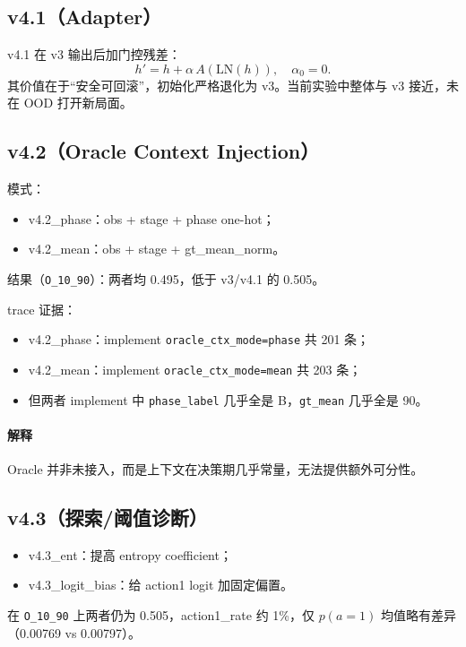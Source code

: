 ﻿\documentclass[11pt,a4paper]{ctexart}
\begin{document}
\subsection{v4.1（Adapter）}
v4.1 在 v3 输出后加门控残差：
\begin{equation}
h'=h+\alpha\,A(\mathrm{LN}(h)),\quad \alpha_0=0.
\end{equation}
其价值在于“安全可回滚”，初始化严格退化为 v3。当前实验中整体与 v3 接近，未在 OOD 打开新局面。

\subsection{v4.2（Oracle Context Injection）}
模式：
\begin{itemize}
  \item v4.2\_phase：obs + stage + phase one-hot；
  \item v4.2\_mean：obs + stage + gt\_mean\_norm。
\end{itemize}
结果（\texttt{O\_10\_90}）：两者均 0.495，低于 v3/v4.1 的 0.505。

trace 证据：
\begin{itemize}
  \item v4.2\_phase：implement \texttt{oracle\_ctx\_mode=phase} 共 201 条；
  \item v4.2\_mean：implement \texttt{oracle\_ctx\_mode=mean} 共 203 条；
  \item 但两者 implement 中 \texttt{phase\_label} 几乎全是 B，\texttt{gt\_mean} 几乎全是 90。
\end{itemize}

\paragraph{解释}
Oracle 并非未接入，而是上下文在决策期几乎常量，无法提供额外可分性。

\subsection{v4.3（探索/阈值诊断）}
\begin{itemize}
  \item v4.3\_ent：提高 entropy coefficient；
  \item v4.3\_logit\_bias：给 action1 logit 加固定偏置。
\end{itemize}

在 \texttt{O\_10\_90} 上两者仍为 0.505，action1\_rate 约 1\%，仅 $p(a=1)$ 均值略有差异（0.00769 vs 0.00797）。
\end{document}
